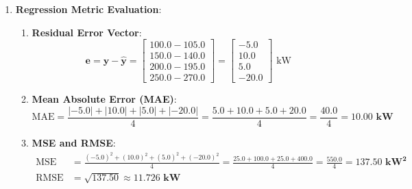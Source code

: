 \begin{enumerate}
\begin{enumerate}[label=(\alph*)]
        \item \textbf{$F_2$-Score ($\beta = 2$)}:
        \begin{equation*}
        F_2 = (1 + 2^2) \frac{\text{Precision} \cdot \text{Recall}}{2^2 \text{Precision} + \text{Recall}} = 5 \cdot \frac{0.60 \times 0.84}{4(0.60) + 0.84} = \frac{2.520}{2.40 + 0.84} = \frac{2.520}{3.24} \approx \mathbf{0.7778}
        \end{equation*}
        \textbf{Operational Significance}: While Accuracy appears deceptively high ($96.4\%$), the model actually misses $16\%$ of physical machine failures ($\text{FN} = 8$ out of $50$). An unpredicted turbine failure causes tens of thousands of dollars in mechanical destruction and downtime, whereas a false alarm ($\text{FP} = 28$) merely incurs a quick technician visual check. The plant manager prioritizes $F_2$ because it weights Recall twice as heavily as Precision, penalizing missed failures rigorously.
    \end{enumerate}

    \item \textbf{Regression Metric Evaluation}:
    \begin{enumerate}[label=(\alph*)]
        \item \textbf{Residual Error Vector}:
        \begin{equation*}
        \mathbf{e} = \mathbf{y} - \hat{\mathbf{y}} = \begin{bmatrix} 100.0 - 105.0 \\ 150.0 - 140.0 \\ 200.0 - 195.0 \\ 250.0 - 270.0 \end{bmatrix} = \begin{bmatrix} -5.0 \\ 10.0 \\ 5.0 \\ -20.0 \end{bmatrix} \text{ kW}
        \end{equation*}

        \item \textbf{Mean Absolute Error (MAE)}:
        \begin{equation*}
        \text{MAE} = \frac{|-5.0| + |10.0| + |5.0| + |-20.0|}{4} = \frac{5.0 + 10.0 + 5.0 + 20.0}{4} = \frac{40.0}{4} = \mathbf{10.00\text{ kW}}
        \end{equation*}

        \item \textbf{MSE and RMSE}:
        \begin{align*}
        \text{MSE} &= \frac{(-5.0)^2 + (10.0)^2 + (5.0)^2 + (-20.0)^2}{4} = \frac{25.0 + 100.0 + 25.0 + 400.0}{4} = \frac{550.0}{4} = \mathbf{137.50\text{ kW}^2} \\
        \text{RMSE} &= \sqrt{137.50} \approx \mathbf{11.726\text{ kW}}
        \end{align*}


\end{enumerate}
\end{enumerate}
